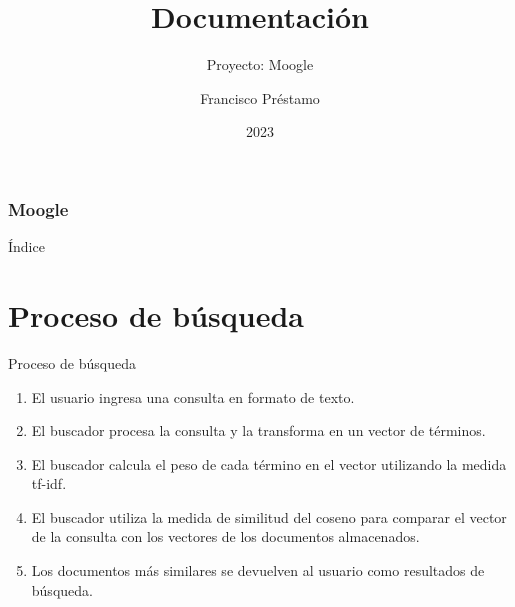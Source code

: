 \documentclass{beamer}
\title{Documentación}
\subtitle{Proyecto: Moogle}
\author{Francisco Préstamo}
\institute{Universidad de la Habana}
\date{2023}
\begin{document}
\begin{frame}
  \titlepage
\end{frame}


\begin{frame}
\frametitle{Moogle}

\begin{center}
\end{center}

\end{frame}

\begin{frame}{Índice}
  \tableofcontents
\end{frame}

\section{Proceso de búsqueda}

\begin{frame}{Proceso de búsqueda}
  \begin{enumerate}
    \item El usuario ingresa una consulta en formato de texto.
    \item El buscador procesa la consulta y la transforma en un vector de términos.
    \item El buscador calcula el peso de cada término en el vector utilizando la medida tf-idf.
    \item El buscador utiliza la medida de similitud del coseno para comparar el vector de la consulta con los vectores de los documentos almacenados.
    \item Los documentos más similares se devuelven al usuario como resultados de búsqueda.
  \end{enumerate}
\end{frame}
\end{document}
